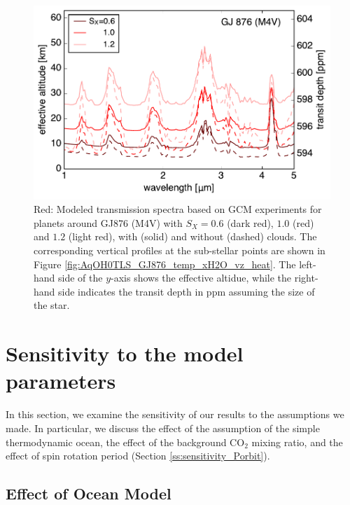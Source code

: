 \documentclass[11pt,numberedappendix,twocolappendix,]{emulateapj}
\begin{document}
\begin{figure}[!h]
    \begin{center}
    \includegraphics[width=\hsize]{fig/transit_GJ876.pdf}
    \end{center}
\caption{Red: Modeled transmission spectra based on GCM experiments for planets around GJ876 (M4V) with $S_X=0.6$ (dark red), $1.0$ (red) and $1.2$ (light red), with (solid) and without (dashed) clouds. The corresponding vertical profiles at the sub-stellar points are shown in Figure \ref{fig:AqOH0TLS_GJ876_temp_xH2O_vz_heat}. The left-hand side of the $y$-axis shows the effective altidue, while the right-hand side indicates the transit depth in ppm assuming the size of the star. }
\label{fig:transmission}
\end{figure}


\section{Sensitivity to the model parameters}
\label{s:sensitivity}

In this section, we examine the sensitivity of our results to the  assumptions we made. 
In particular, we discuss the effect of the assumption of the simple thermodynamic ocean, the effect of the background CO$_2$ mixing ratio, and the effect of spin rotation period (Section \ref{ss:sensitivity_Porbit}). 



\subsection{Effect of Ocean Model}
\label{ss:sensitivity_ocean}
\end{document}
